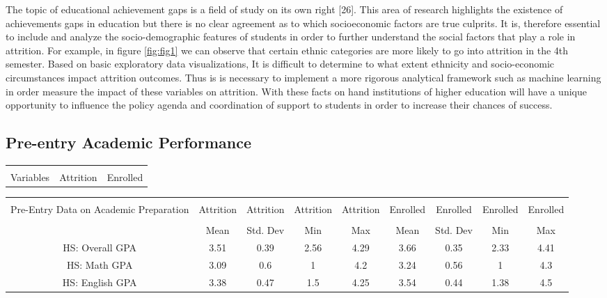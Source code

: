 \documentclass[notitlepage,12pt]{jedm}
\begin{document}
\par The topic of educational achievement gaps is a field of study on its own right [26]. This area of research highlights the existence of achievements gaps in education but there is no clear agreement as to which socioeconomic factors are true culprits. It is, therefore essential to include and analyze the socio-demographic features of students in order to further understand the social factors that play a role in attrition.  For example, in figure \ref{fig:fig1} we can observe that certain ethnic categories are more likely to go into attrition in the 4th semester. Based on basic exploratory data visualizations, It is difficult to determine to what extent ethnicity and socio-economic circumstances impact attrition outcomes. Thus is is necessary to implement a more rigorous analytical framework such as machine learning in order measure the impact of these variables on attrition. With these facts on hand institutions of higher education will have a unique opportunity to influence the policy agenda and coordination of support to students in order to increase their chances of success.

\subsection{Pre-entry Academic Performance}

\begin{center}
\begin{tabular}{||c | c | c||}
 \hline
 \\ Variables & Attrition & Enrolled \\ [0.5ex]
 \hline
\end{tabular}
\begin{tabular}{||c c c c c c c c c||} 
 \hline
 \\ Pre-Entry Data on Academic Preparation & Attrition & Attrition & Attrition & Attrition & Enrolled & Enrolled & Enrolled & Enrolled \\ [0.5ex] 
 \hline
 \\  & Mean & Std. Dev & Min & Max & Mean & Std. Dev & Min & Max  \\
 \hline
 HS: Overall GPA & 3.51 & 0.39 & 2.56 & 4.29 & 3.66 & 0.35 & 2.33 & 4.41 \\
 \hline
 HS: Math GPA & 3.09 & 0.6 & 1 & 4.2 & 3.24 & 0.56 & 1 & 4.3 \\
 \hline
 HS: English GPA & 3.38 & 0.47 & 1.5 & 4.25 & 3.54 & 0.44 & 1.38 & 4.5 \\ [1ex] 
 \hline
\end{tabular}
\end{center}
 
\end{document}
